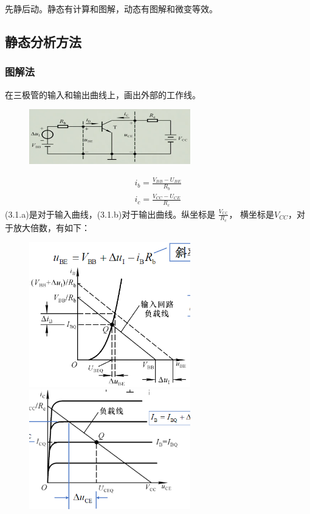 先静后动。静态有计算和图解，动态有图解和微变等效。
\subsection{静态分析方法}

\subsubsection{图解法}
在三极管的输入和输出曲线上，画出外部的工作线。
        \begin{figure}[H]
            \centering
            \includegraphics[width=7cm]{img/2.4.png}
            \end{figure}
\begin{align}
i_b=\frac{V_{BB}-U_{BE}}{R_b} \tag{3.1.a} \\
i_c=\frac{V_{CC}-U_{CE}}{R_c} \tag{3.1.b} 
\end{align}
(3.1.a)是对于输入曲线，(3.1.b)对于输出曲线。纵坐标是
$\displaystyle  \frac{V_{\mathbb{CC}}}{R_c}$，
横坐标是$V_{CC}$，对于放大倍数，有如下：
        \begin{figure}[H]
            \centering
            \includegraphics[width=7cm]{img/2.5.png}
            \includegraphics[width=7cm]{img/2.7.png}

            \end{figure}
